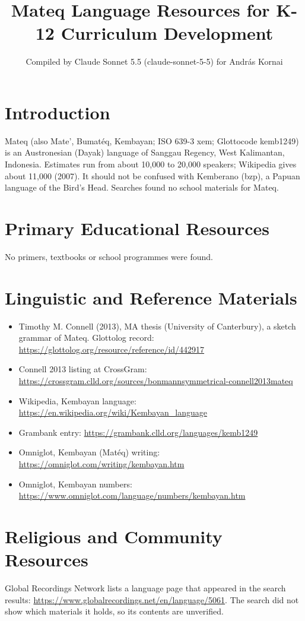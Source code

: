 \documentclass[12pt]{article}
\title{Mateq Language Resources for K-12 Curriculum Development}
\author{Compiled by Claude Sonnet 5.5 (claude-sonnet-5-5) for Andr\'as Kornai}
\date{}
\begin{document}
\maketitle

\section{Introduction}
Mateq (also Mate', Bumat\'eq, Kembayan; ISO 639-3 xem; Glottocode kemb1249) is an Austronesian (Dayak) language of Sanggau Regency, West Kalimantan, Indonesia. Estimates run from about 10,000 to 20,000 speakers; Wikipedia gives about 11,000 (2007). It should not be confused with Kemberano (bzp), a Papuan language of the Bird's Head. Searches found no school materials for Mateq.

\section{Primary Educational Resources}
No primers, textbooks or school programmes were found.

\section{Linguistic and Reference Materials}
\begin{itemize}
\item Timothy M. Connell (2013), MA thesis (University of Canterbury), a sketch grammar of Mateq. Glottolog record: \url{https://glottolog.org/resource/reference/id/442917}
\item Connell 2013 listing at CrossGram: \url{https://crossgram.clld.org/sources/bonmannsymmetrical-connell2013mateq}
\item Wikipedia, Kembayan language: \url{https://en.wikipedia.org/wiki/Kembayan_language}
\item Grambank entry: \url{https://grambank.clld.org/languages/kemb1249}
\item Omniglot, Kembayan (Mat\'eq) writing: \url{https://omniglot.com/writing/kembayan.htm}
\item Omniglot, Kembayan numbers: \url{https://www.omniglot.com/language/numbers/kembayan.htm}
\end{itemize}

\section{Religious and Community Resources}
Global Recordings Network lists a language page that appeared in the search results: \url{https://www.globalrecordings.net/en/language/5061}. The search did not show which materials it holds, so its contents are unverified.
\end{document}
